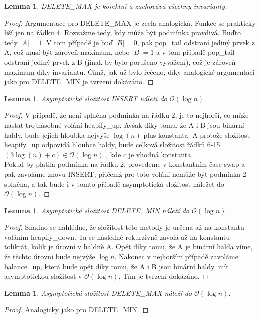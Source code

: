 \documentclass[12pt,a4paper]{article}
\theoremstyle{plain}
\newtheorem{lemma}[thm]{Lemma}
\begin{document}
\begin{lemma} DELETE\_MAX je korektní a zachovává všechny invarianty.
\end{lemma}
\begin{proof}
Argumentace pro DELETE\_MAX je zcela analogická. Funkce se prakticky liší
jen na řádku 4. Rozvažme tedy, kdy může být podmínka pravdivá. Buďto tedy $ |A| = 1 $. V tom případě je buď $ |B| = 0 $, pak pop\_tail odstraní jediný prvek z A, což musí být zároveň maximum, nebo $ |B| = 1 $ a v tom případě pop\_tail odstraní jediný prvek z B (jinak by bylo porušeno vyvážení), což je zároveň maximum díky invariantu. Čímž, jak už bylo řečeno, díky analogické argumentaci jako pro DELETE\_MIN je tvrzení dokázáno.

\end{proof}

\begin{lemma} Asymptotická složitost INSERT náleží do $\mathcal{O}(\log n)$.
\end{lemma}
\begin{proof}
V případě, že není splněna podmínka na řádku 2, je to nejhorší, co může nastat trojnásobné volání heapify\_up. Avšak díky tomu, že A i B jsou binární haldy, bude jejich hloubka nejvýše $ \log(n) $ plus konstanta. A protože složitost heapify\_up odpovídá hloubce haldy, bude celková složitost řádků 6-15 $ (3\log(n) + c) \in \mathcal{O}(\log n)$ , kde $ c $ je vhodná konstanta. \\
Pokud by platila podmínka na řádku 2, provedeme v konstantním čase swap a pak zavoláme znovu INSERT, přičemž pro toto volání nemůže být podmínka 2 splněna, a tak bude i v tomto případě asymptotická složitost náležet do $\mathcal{O}(\log n)$.

\end{proof}

\begin{lemma} Asymptotická složitost DELETE\_MIN náleží do $\mathcal{O}(\log n)$.
\end{lemma}
\begin{proof}
Snadno se nahlédne, že složitost této metody je určena až na konstantu voláním heapify\_down. Ta se následně rekurzivně zavolá až na konstantu tolikrát, kolik je úrovní v haldně A. Opět díky tomu, že A je binární halda víme, že těchto úrovní bude nejvýše $ \log n $. Nakonec v nejhorším případě zavoláme balance\_up, která bude opět díky tomu, že A i B jsou binární haldy, mít asymptotickou složitost v $\mathcal{O}(\log n)$. Tím je tvrzení dokázáno.
\end{proof}

\begin{lemma} Asymptotická složitost DELETE\_MAX náleží do $\mathcal{O}(\log n)$.
\end{lemma}
\begin{proof}
Analogicky jako pro DELETE\_MIN. 
\end{proof}
\end{document}
